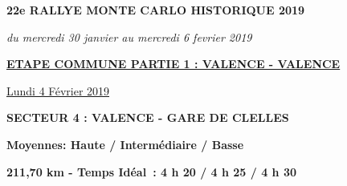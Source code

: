 \documentclass{article}%
\begin{document}
%
\normalsize%
\begin{center} \textbf{\LARGE{22e RALLYE MONTE CARLO HISTORIQUE 2019}} \end{center}%
\begin{center} \textit{du mercredi 30 janvier au mercredi 6 fevrier 2019} \end{center}%
\begin{center} \textbf{\underline{ETAPE COMMUNE PARTIE 1 : VALENCE - VALENCE}} \end{center}%
\begin{flushright} \underline{Lundi 4 Février 2019
} \end{flushright}%
\begin{flushleft} \textbf{SECTEUR 4 : VALENCE - GARE DE CLELLES
} \end{flushleft}%
\begin{flushright} \textbf{             Moyennes: Haute / Intermédiaire / Basse
} \end{flushright}%
\begin{flushright} \textbf{211,70 km - Temps Idéal : 4 h 20 / 4 h 25 / 4 h 30
} \end{flushright}%
\end{document}
